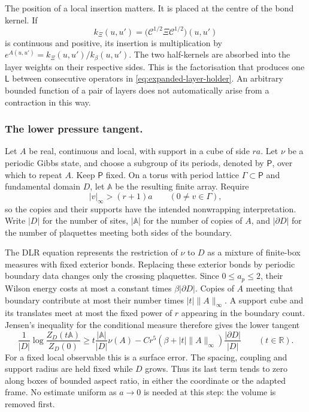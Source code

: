 \documentclass[11pt,letterpaper,reqno]{amsart}
\theoremstyle{definition}
\theoremstyle{remark}
\newcommand{\R}{\mathbb R}
\begin{document}
The position of a local insertion matters. It is placed at the centre
of the bond kernel. If
\[
 k_{\Xi}(u,u')=
  \big(\mathcal C^{1/2}\Xi\mathcal C^{1/2}\big)(u,u')
\]
is continuous and positive, its insertion is multiplication by
$e^{A(u,u')}=k_\Xi(u,u')/k_\beta(u,u')$. The two half-kernels are
absorbed into the layer weights on their respective sides. This is
the factorisation that produces one $\mathsf L$ between consecutive
operators in \eqref{eq:expanded-layer-holder}. An arbitrary bounded
function of a pair of layers does not automatically arise from a
contraction in this way.

\subsubsection*{The lower pressure tangent.}
Let $A$ be real, continuous and local, with support in a cube of side
$ra$. Let $\nu$ be a periodic Gibbs state, and choose a subgroup of
its periods, denoted by $\mathsf P$, over which to repeat $A$. Keep
$\mathsf P$ fixed. On a torus with period lattice
$\Gamma\subset\mathsf P$ and fundamental domain $D$, let $\mathbb A$ be the resulting
finite array. Require
\[
 |v|_\infty>(r+1)a\qquad(0\ne v\in\Gamma),
\]
so the copies and their supports have the intended nonwrapping
interpretation. Write $|D|$ for the number of sites, $|\mathbb A|$
for the number of copies of $A$, and $|\partial D|$ for the number of
plaquettes meeting both sides of the boundary.

The DLR equation represents the restriction of $\nu$ to $D$ as a
mixture of finite-box measures with fixed exterior bonds. Replacing
these exterior bonds by periodic boundary data changes only the
crossing plaquettes. Since $0\le a_p\le2$, their Wilson energy costs
at most a constant times $\beta|\partial D|$. Copies of $A$ meeting
that boundary contribute at most their number times
$|t|\|A\|_\infty$. A support cube and its translates meet at most the
fixed power of $r$ appearing in the boundary count. Jensen's
inequality for the conditional measure therefore gives the lower
tangent
\begin{equation}\label{eq:pressure-tangent}
 \frac1{|D|}\log\frac{Z_D(t\mathbb A)}{Z_D(0)}
 \ge t\frac{|\mathbb A|}{|D|}\nu(A)
 -Cr^5(\beta+|t|\|A\|_\infty)
\frac{|\partial D|}{|D|}
                         \qquad(t\in\R).
\end{equation}
For a fixed local observable this is a surface error. The spacing,
coupling and support radius are held fixed while $D$ grows. Thus its
last term tends to zero along boxes of bounded aspect ratio, in either
the coordinate or the adapted frame. No estimate uniform as
$a\to0$ is needed at this step: the volume is removed first.
\end{document}
